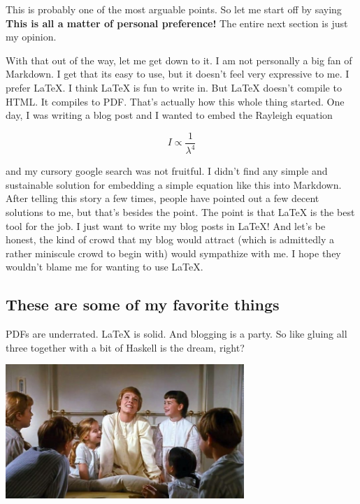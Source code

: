 \documentclass[12pt]{article}
\begin{document}
  This is probably one of the most arguable points. So let me start off by saying \textbf{This is all a matter of personal preference!} The entire next section is just my opinion. 

  With that out of the way, let me get down to it. I am not personally a big fan of Markdown. I get that its easy to use, but it doesn't feel very expressive to me. I prefer LaTeX. I think LaTeX is fun to write in. But LaTeX doesn't compile to HTML. It compiles to PDF. That's actually how this whole thing started. One day, I was writing a blog post and I wanted to embed the Rayleigh equation 

  \begin{displaymath}
  I \propto \frac{1}{\lambda^4}
  \end{displaymath}

  and my cursory google search was not fruitful. I didn't find any simple and sustainable solution for embedding a simple equation like this into Markdown. After telling this story a few times, people have pointed out a few decent solutions to me, but that's besides the point. The point is that LaTeX is the best tool for the job. I just want to write my blog posts in LaTeX! And let's be honest, the kind of crowd that my blog would attract (which is admittedly a rather miniscule crowd to begin with) would sympathize with me. I hope they wouldn't blame me for wanting to use LaTeX. 

  \subsection{These are some of my favorite things}  

  PDFs are underrated. LaTeX is solid. And blogging is a party. So like gluing all three together with a bit of Haskell is the dream, right?

  \begin{center}
  \includegraphics[height=2in]{favorite_things}
  \end{center}
\end{document}

